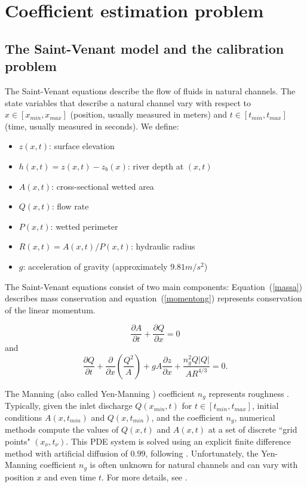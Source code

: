 \documentclass[11pt]{article}
\begin{document}
\section{Coefficient estimation problem} \label{cap:coeficient_estimation}

\subsection{The Saint-Venant model and the calibration problem}

The Saint-Venant equations \cite{castro,leveque,porto,saintvenant} 
  describe the flow of fluids in natural channels. The state variables that describe a natural channel vary
  with respect to $x \in [x_{min}, x_{max}]$ (position, usually measured  in meters) and $t \in [t_{min},t_{max}]$ (time, usually
  measured in seconds).
  We define:

\begin{itemize}
\item $z(x, t)$: surface elevation
\item $h(x,t) = z(x,t) - z_b(x)$: river depth at $(x,t)$
\item $A(x,t)$: cross-sectional wetted area
\item $Q(x,t)$: flow rate
\item $P(x,t)$: wetted perimeter
\item $R(x,t) = A(x,t) / P(x,t)$: hydraulic radius
\item $g$: acceleration of gravity (approximately $9.81 m/s^2$)
\end{itemize}

 The Saint-Venant equations consist of two main components:
Equation~(\ref{massa})
describes mass conservation and equation~(\ref{momentong}) represents
conservation of the linear momentum.                                


\begin{equation} \label{massa}
\frac{\partial A}{\partial t} + \frac{\partial Q}{\partial x} = 0
\end{equation}
and
\begin{equation} \label{momentong}
\frac{\partial Q}{\partial t} + \frac{\partial}{\partial x}
\left(\frac{Q^2}{A}\right) + g A \frac{\partial z}{\partial x} +
\frac{n_g^2 Q|Q|}{A R^{4/3}} = 0.
\end{equation} 

 The Manning (also called Yen-Manning \cite{bcgmr}) coefficient $n_g$ represents roughness \cite{bcgmr}.
Typically, given the inlet discharge $Q(x_{min}, t)$ for $t \in [t_{min}, t_{max}]$, initial conditions $A(x, t_{min})$ 
and $Q(x, t_{min})$, and the coefficient $n_g$, numerical methods compute the values of $Q(x, t)$ and $A(x, t)$ at a set
 of discrete ``grid points" $(x_\nu, t_\nu)$. This PDE system is solved using an explicit finite difference method with artificial diffusion of $0.99$, following \cite{leveque,porto}. Unfortunately, the Yen-Manning coefficient $n_g$ is often unknown for natural channels
 and can vary with position $x$ and even time $t$. {For more details, see \cite{bcgmr}}.  
\end{document}
